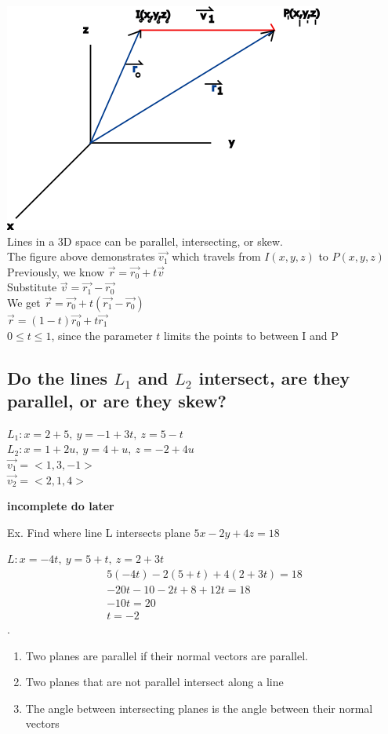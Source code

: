 \documentclass[12pt]{article}
\begin{document}
\includegraphics{3dline2}\\%
Lines in a 3D space can be parallel, intersecting, or skew.\\%
The figure above demonstrates $\vec{v_1}  $ which travels from $I(x,y,z)$ to $P(x,y,z)$\\%
Previously, we know $\vec{r} =\vec{r_0} +t \vec{v}    $\\%
Substitute $\vec{v} =\vec{r_1} -\vec{r_0}  $\\%
We get $\vec{r} =\vec{r_0} +t(\vec{r_1} -  \vec{r_0} )  $ \\%
$\vec{r} =  (1-t)\vec{r_0}  +t\vec{r_1}    $\\%
$0\leq t\leq1$, since the parameter $t$ limits the points to between I and P

\subsection{Do the lines $L_1$ and $L_2$ intersect, are they parallel, or are they skew?}
$L_1: x = 2 + 5,\ y = -1 + 3t,\ z = 5-t$\\%
$L_2: x = 1 + 2u,\ y = 4 + u,\ z = -2 + 4u$\\%
$\vec{v_1}=<1, 3, -1>  $\\%
$\vec{v_2} =<2,1,4> $

\bigskip
\textbf{incomplete do later}

Ex. 
Find where line L intersects plane $5x-2y+4z=18$

$L: x= -4t,\ y=5+t,\ z=2+3t$
\begin{align}
5(-4t)-2(5+t)+4(2+3t)=18\\
-20t-10-2t+8+12t=18\\
-10t=20\\
t=-2
\end{align}.
\begin{enumerate}
	\item Two planes are parallel if their normal vectors are parallel.
	\item Two planes that are not parallel intersect along a line
	\item The angle between intersecting planes is the angle between their normal vectors 
\end{enumerate}
\end{document}
